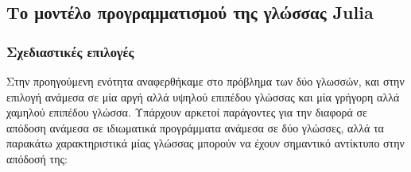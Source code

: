 \subsection{Το μοντέλο προγραμματισμού της γλώσσας Julia}

\subsubsection{Σχεδιαστικές επιλογές}

Στην προηγούμενη ενότητα αναφερθήκαμε στο πρόβλημα των δύο γλωσσών, και στην επιλογή ανάμεσα σε μία αργή αλλά υψηλού επιπέδου γλώσσας και μία γρήγορη αλλά χαμηλού επιπέδου γλώσσα.
Υπάρχουν αρκετοί παράγοντες για την διαφορά σε απόδοση ανάμεσα σε ιδιωματικά προγράμματα ανάμεσα σε δύο γλώσσες, αλλά τα παρακάτω χαρακτηριστικά μίας γλώσσας μπορούν να έχουν σημαντικό αντίκτυπο στην απόδοσή της:

